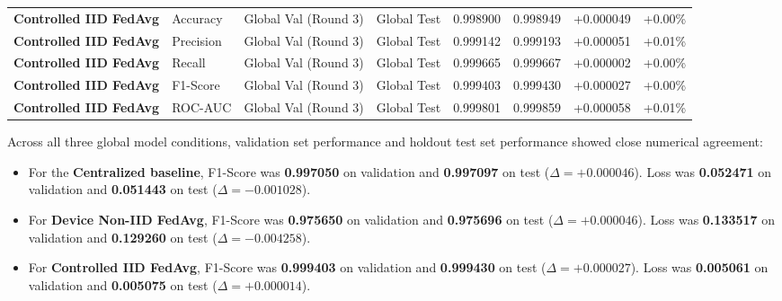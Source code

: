 \documentclass[11pt,a4paper]{article}
\begin{document}
\begin{table}[htbp]
\begin{adjustbox}{width=\textwidth,center}
\begin{tabular}{l l l l c c c c}
\textbf{Controlled IID FedAvg} & Accuracy & Global Val (Round 3) & Global Test & 0.998900 & 0.998949 & +0.000049 & +0.00\% \\
\textbf{Controlled IID FedAvg} & Precision & Global Val (Round 3) & Global Test & 0.999142 & 0.999193 & +0.000051 & +0.01\% \\
\textbf{Controlled IID FedAvg} & Recall & Global Val (Round 3) & Global Test & 0.999665 & 0.999667 & +0.000002 & +0.00\% \\
\textbf{Controlled IID FedAvg} & F1-Score & Global Val (Round 3) & Global Test & 0.999403 & 0.999430 & +0.000027 & +0.00\% \\
\textbf{Controlled IID FedAvg} & ROC-AUC & Global Val (Round 3) & Global Test & 0.999801 & 0.999859 & +0.000058 & +0.01\% \\
\bottomrule
\end{tabular}
\end{adjustbox}
\end{table}

Across all three global model conditions, validation set performance and holdout test set performance showed close numerical agreement:

\begin{itemize}
    \item For the \textbf{Centralized baseline}, F1-Score was \textbf{0.997050} on validation and \textbf{0.997097} on test ($\Delta = +0.000046$). Loss was \textbf{0.052471} on validation and \textbf{0.051443} on test ($\Delta = -0.001028$).
    \item For \textbf{Device Non-IID FedAvg}, F1-Score was \textbf{0.975650} on validation and \textbf{0.975696} on test ($\Delta = +0.000046$). Loss was \textbf{0.133517} on validation and \textbf{0.129260} on test ($\Delta = -0.004258$).
    \item For \textbf{Controlled IID FedAvg}, F1-Score was \textbf{0.999403} on validation and \textbf{0.999430} on test ($\Delta = +0.000027$). Loss was \textbf{0.005061} on validation and \textbf{0.005075} on test ($\Delta = +0.000014$).
\end{itemize}
\end{document}
